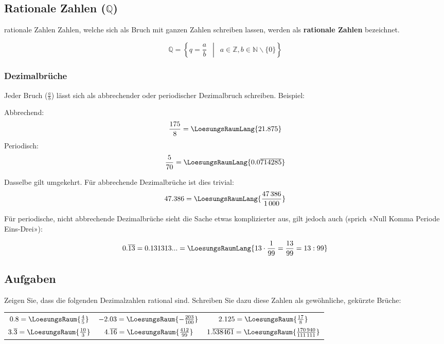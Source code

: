 \subsection{Rationale Zahlen ($\mathbb{Q}$)}

\begin{definition}{rationale Zahlen}{}
Zahlen, welche sich als Bruch mit ganzen Zahlen schreiben lassen,
werden als \textbf{rationale Zahlen} bezeichnet.


$$\mathbb{Q} =\left\{ q = \frac{a}{b} \,\,\, \middle| \,\,\, a \in \mathbb{Z}, b \in \mathbb{N}\backslash{}\{0\}\right\}$$
\end{definition}

\subsubsection{Dezimalbrüche}
Jeder Bruch ($\frac{a}{b}$) lässt sich als
abbrechender oder periodischer Dezimalbruch schreiben. Beispiel:

Abbrechend:
$$\frac{175}{8} = \LoesungsRaumLang{21.875}$$
Periodisch:
$$\frac{5}{70} = \LoesungsRaumLang{0.0\overline{714285}}$$

Dasselbe gilt umgekehrt. Für abbrechende Dezimalbrüche ist dies
trivial:
$$47.386 = \LoesungsRaumLang{\frac{47\,386}{1\,000}}$$

Für periodische, nicht abbrechende
Dezimalbrüche sieht die Sache etwas komplizierter aus,
gilt jedoch auch (sprich «Null Komma Periode Eins-Drei»):

$$0.\overline{13} = 0.131313... = \LoesungsRaumLang{13\cdot{}\frac1{99}=\frac{13}{99} = 13 : 99}$$



  \subsection*{Aufgaben}
  Zeigen Sie, dass die folgenden Dezimalzahlen rational sind. Schreiben Sie dazu diese Zahlen als gewöhnliche, gekürzte Brüche:

  \renewcommand{\arraystretch}{1.5}
  \begin{tabular}{|c|c|c|}
  $0.8=\LoesungsRaum{\frac45}$                  & $-2.03=\LoesungsRaum{-\frac{203}{100}}$         & $2.125=\LoesungsRaum{\frac{17}{8}}$                             \\
  $3.\overline{3}=\LoesungsRaum{\frac{10}{3} }$ & $4.\overline{16}=\LoesungsRaum{\frac{412}{99}}$ & $1.\overline{538461} =\LoesungsRaum{\frac{170\,940}{111\,111}}$ 
  \end{tabular} 
  \renewcommand{\arraystretch}{1}


